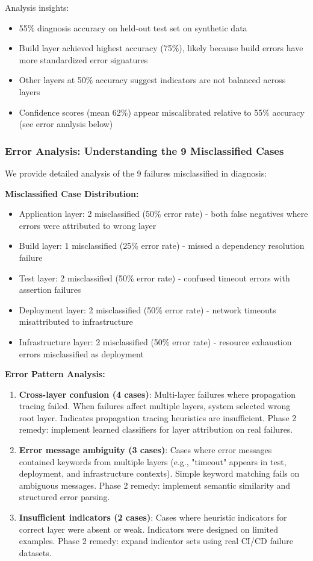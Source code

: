 \documentclass[11pt]{article}
\begin{document}
Analysis insights:
\begin{itemize}
    \item 55\% diagnosis accuracy on held-out test set on synthetic data
    \item Build layer achieved highest accuracy (75\%), likely because build errors have more standardized error signatures
    \item Other layers at 50\% accuracy suggest indicators are not balanced across layers
    \item Confidence scores (mean 62\%) appear miscalibrated relative to 55\% accuracy (see error analysis below)
\end{itemize}

\subsubsection{Error Analysis: Understanding the 9 Misclassified Cases}

We provide detailed analysis of the 9 failures misclassified in diagnosis:

\textbf{Misclassified Case Distribution:}
\begin{itemize}
    \item Application layer: 2 misclassified (50\% error rate) - both false negatives where errors were attributed to wrong layer
    \item Build layer: 1 misclassified (25\% error rate) - missed a dependency resolution failure
    \item Test layer: 2 misclassified (50\% error rate) - confused timeout errors with assertion failures
    \item Deployment layer: 2 misclassified (50\% error rate) - network timeouts misattributed to infrastructure
    \item Infrastructure layer: 2 misclassified (50\% error rate) - resource exhaustion errors misclassified as deployment
\end{itemize}

\textbf{Error Pattern Analysis:}
\begin{enumerate}
    \item \textbf{Cross-layer confusion (4 cases)}: Multi-layer failures where propagation tracing failed. When failures affect multiple layers, system selected wrong root layer. Indicates propagation tracing heuristics are insufficient. Phase 2 remedy: implement learned classifiers for layer attribution on real failures.

    \item \textbf{Error message ambiguity (3 cases)}: Cases where error messages contained keywords from multiple layers (e.g., "timeout" appears in test, deployment, and infrastructure contexts). Simple keyword matching fails on ambiguous messages. Phase 2 remedy: implement semantic similarity and structured error parsing.

    \item \textbf{Insufficient indicators (2 cases)}: Cases where heuristic indicators for correct layer were absent or weak. Indicators were designed on limited examples. Phase 2 remedy: expand indicator sets using real CI/CD failure datasets.
\end{enumerate}
\end{document}
